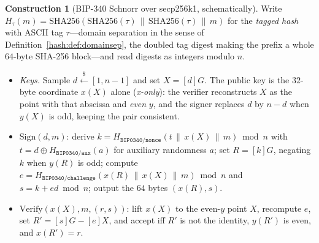 \documentclass[11pt,a4paper]{article}
\theoremstyle{definition}
\newtheorem{construction}[theorem]{Construction}
\theoremstyle{remark}
\begin{document}
\begin{construction}[BIP-340 Schnorr over secp256k1, schematically]
\label{signatures:con:bip340}
Write
\(H_{\tau}(m) = \mathrm{SHA256}(\mathrm{SHA256}(\tau) \,\|\,
\mathrm{SHA256}(\tau) \,\|\, m)\) for the \emph{tagged hash} with
ASCII tag \(\tau\)---domain separation in the sense of
Definition~\ref{hash:def:domainsep}, the doubled tag digest making
the prefix a whole \(64\)-byte SHA-256 block---and read digests as
integers modulo \(n\).
\begin{itemize}
\item \emph{Keys.} Sample \(d \xleftarrow{\$} [1, n-1]\) and set
  \(X = [d]G\). The public key is the \(32\)-byte coordinate
  \(x(X)\) alone (\emph{x-only}): the verifier reconstructs \(X\) as
  the point with that abscissa and \emph{even} \(y\), and the signer
  replaces \(d\) by \(n - d\) when \(y(X)\) is odd, keeping the pair
  consistent.
\item \(\mathrm{Sign}(d, m)\): derive
  \(k = H_{\mathtt{BIP0340/nonce}}(t \,\|\, x(X) \,\|\, m) \bmod n\)
  with \(t = d \oplus H_{\mathtt{BIP0340/aux}}(a)\) for auxiliary
  randomness \(a\); set \(R = [k]G\), negating \(k\) when \(y(R)\) is
  odd; compute
  \(e = H_{\mathtt{BIP0340/challenge}}(x(R) \,\|\, x(X) \,\|\, m)
  \bmod n\) and \(s = k + e d \bmod n\); output the \(64\) bytes
  \((x(R), s)\).
\item \(\mathrm{Verify}(x(X), m, (r, s))\): lift \(x(X)\) to the
  even-\(y\) point \(X\), recompute \(e\), set
  \(R' = [s]G - [e]X\), and accept iff \(R'\) is not the identity,
  \(y(R')\) is even, and \(x(R') = r\).
\end{itemize}
\end{construction}
\end{document}
